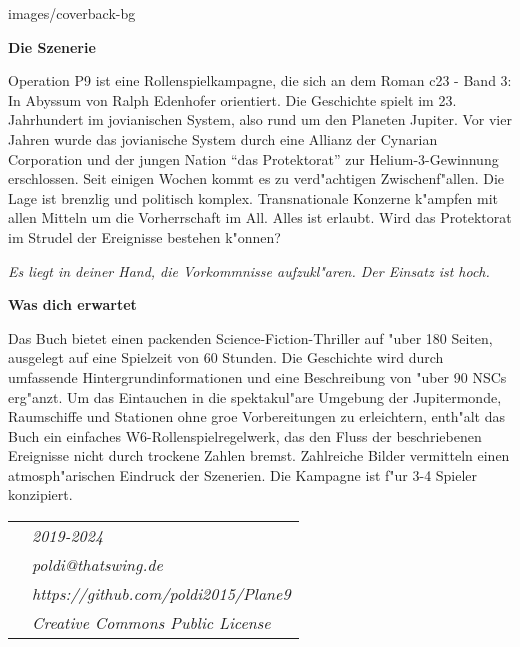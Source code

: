 \begin{backcover}{images/coverback-bg}

    \vspace{5mm}
    \textbf{Die Szenerie}

    Operation P9 ist eine Rollenspielkampagne, die sich an dem Roman c23 - Band 3: In Abyssum von Ralph Edenhofer orientiert. Die Geschichte spielt im 23. Jahrhundert im jovianischen System, also rund um den Planeten Jupiter. Vor vier Jahren wurde das jovianische System durch eine Allianz der Cynarian Corporation und der jungen Nation ``das Protektorat'' zur Helium-3-Gewinnung erschlossen. Seit einigen Wochen kommt es zu verd"achtigen Zwischenf"allen. Die Lage ist brenzlig und politisch komplex. Transnationale Konzerne k"ampfen mit allen Mitteln um die Vorherrschaft im All. Alles ist erlaubt. Wird das Protektorat im Strudel der Ereignisse bestehen k"onnen?

    \medskip
    \emph{Es liegt in deiner Hand, die Vorkommnisse aufzukl"aren. Der Einsatz ist hoch.}

    \vspace{5mm}
    \textbf{Was dich erwartet}

    Das Buch bietet einen packenden Science-Fiction-Thriller auf "uber 180 Seiten, ausgelegt auf eine Spielzeit von 60 Stunden. Die Geschichte wird durch umfassende Hintergrundinformationen und eine Beschreibung von "uber 90 NSCs erg"anzt. Um das Eintauchen in die spektakul"are Umgebung der Jupitermonde, Raumschiffe und Stationen ohne gro\3e Vorbereitungen zu erleichtern, enth"alt das Buch ein einfaches W6-Rollenspielregelwerk, das den Fluss der beschriebenen Ereignisse nicht durch trockene Zahlen bremst. Zahlreiche Bilder vermitteln einen atmosph"arischen Eindruck der Szenerien. Die Kampagne ist f"ur 3-4 Spieler konzipiert.

    \vspace{15mm}
    \newcommand{\footerentry}[1]{\textit{\normalsize{}{#1}}}
    \begin{tabularx}{\textwidth} {
        >{\raggedright\arraybackslash}X
        >{\raggedleft\arraybackslash}X
    }
        & \footerentry{2019-2024} \\
        & \footerentry{poldi@thatswing.de}\\
        & \footerentry{https://github.com/poldi2015/Plane9}\\
        & \footerentry{Creative Commons Public License} 
    \end{tabularx}

\end{backcover}
